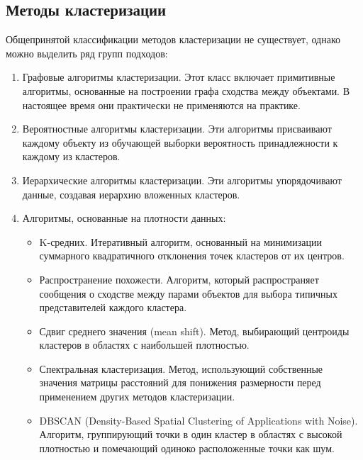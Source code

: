 	\subsection{Методы кластеризации}
		Общепринятой классификации методов кластеризации не существует, однако можно выделить ряд групп подходов:
		\begin{enumerate}
			\item Графовые алгоритмы кластеризации. Этот класс включает примитивные алгоритмы, основанные на построении графа сходства между объектами. В настоящее время они практически не применяются на практике.
			\item Вероятностные алгоритмы кластеризации. Эти алгоритмы присваивают каждому объекту из обучающей выборки вероятность принадлежности к каждому из кластеров.
			\item Иерархические алгоритмы кластеризации. Эти алгоритмы упорядочивают данные, создавая иерархию вложенных кластеров.
			\item Алгоритмы, основанные на плотности данных:
			\begin{itemize}
				\item K-средних. Итеративный алгоритм, основанный на минимизации суммарного квадратичного отклонения точек кластеров от их центров.
				\item Распространение похожести. Алгоритм, который распространяет сообщения о сходстве между парами объектов для выбора типичных представителей каждого кластера.
				\item Сдвиг среднего значения (mean shift). Метод, выбирающий центроиды кластеров в областях с наибольшей плотностью.
				\item Спектральная кластеризация. Метод, использующий собственные значения матрицы расстояний для понижения размерности перед применением других методов кластеризации.
				\item DBSCAN (Density-Based Spatial Clustering of Applications with Noise). Алгоритм, группирующий точки в один кластер в областях с высокой плотностью и помечающий одиноко расположенные точки как шум.
			\end{itemize}
		\end{enumerate}

